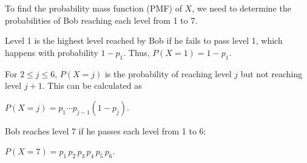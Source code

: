To find the probability mass function (PMF) of $X$, we need to determine the probabilities of Bob reaching each level from 1 to 7.

Level 1 is the highest level reached by Bob if he fails to pass level 1, which happens with probability $1-p_1$.
Thus, $P(X=1) = 1 - p_1$.

For $2 \leq j \leq 6$, $P(X = j)$ is the probability of reaching level $j$ but not reaching level $j+1$. 
This can be calculated as 

$P(X = j) = p_1 \cdots p_{j-1}  (1 - p_j)$.

Bob reaches level 7 if he passes each level from 1 to 6:

$P(X = 7) = p_1 \, p_2 \, p_3 \, p_4 \, p_5 \, p_6$.
